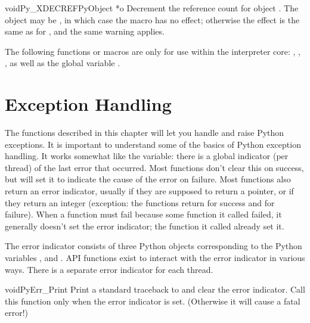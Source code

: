 \documentclass{manual}
\begin{document}
\begin{cfuncdesc}{void}{Py_XDECREF}{PyObject *o}
Decrement the reference count for object .  The object may be
\NULL{}, in which case the macro has no effect; otherwise the effect
is the same as for , and the same warning
applies.
\end{cfuncdesc}

The following functions or macros are only for use within the
interpreter core: ,
, , as
well as the global variable .


\chapter{Exception Handling \label{exceptionHandling}}

The functions described in this chapter will let you handle and raise Python
exceptions.  It is important to understand some of the basics of
Python exception handling.  It works somewhat like the
\UNIX{}  variable: there is a global indicator (per
thread) of the last error that occurred.  Most functions don't clear
this on success, but will set it to indicate the cause of the error on
failure.  Most functions also return an error indicator, usually
\NULL{} if they are supposed to return a pointer, or  if they
return an integer (exception: the  functions
return  for success and  for failure).  When a
function must fail because some function it called failed, it
generally doesn't set the error indicator; the function it called
already set it.

The error indicator consists of three Python objects corresponding to
the Python variables ,  and
.  API functions exist to interact with the
error indicator in various ways.  There is a separate error indicator
for each thread.


\begin{cfuncdesc}{void}{PyErr_Print}{}
Print a standard traceback to  and clear the error
indicator.  Call this function only when the error indicator is set.
(Otherwise it will cause a fatal error!)
\end{cfuncdesc}
\end{document}
